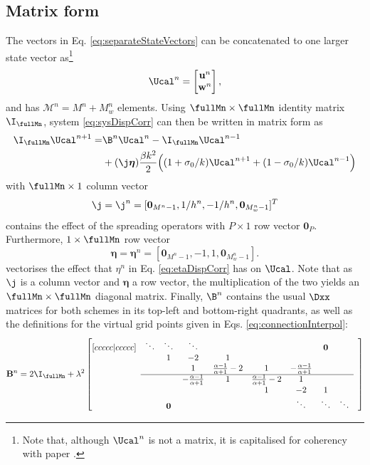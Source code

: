 \subsection{Matrix form}
The vectors in Eq. \eqref{eq:separateStateVectors} can be concatenated to one larger state vector as\footnote{Note that, although $\Ucal^n$ is not a matrix, it is capitalised for coherency with paper \citeP[G].}
\begin{equation}\label{eq:fullState}
    \Ucal^n = \begin{bmatrix}
        \mathbf{u}^n \\
        \mathbf{w}^n
    \end{bmatrix},
\end{equation}
and has $\mathcal{M}^n = M^n+M_w^n$ elements. 
Using $\fullMn \times \fullMn$ identity matrix $\I_\fullMn$, system \eqref{eq:sysDispCorr} can then be written in matrix form as
\begin{equation}\label{eq:intermediateMatrixFormDynamic}
    \begin{aligned}
        \I_\fullMn\Ucal^{n+1} = &\B^n\Ucal^n - \I_\fullMn\Ucal^{n-1} \\
        &+ (\j\boldsymbol{\eta})\frac{\beta k^2}{2}\Big((1+\sigma_0/k)\Ucal^{n+1} + (1-\sigma_0/k)\Ucal^{n-1}\Big)
    \end{aligned}
\end{equation}
with $\fullMn \times 1$ column vector
\begin{equation*}
    \j = \j^n = [\mathbf{0}_{M^n-1}, 1/h^n, -1/h^n, \mathbf{0}_{M_w^n-1}]^T
\end{equation*}
contains the effect of the spreading operators with $P\times 1$ row vector $\mathbf{0}_P$. Furthermore, $1\times \fullMn$ row vector
\begin{equation*}
    \boldsymbol{\eta} = \boldsymbol{\eta}^n = [\mathbf{0}_{M^n-1}, -1, 1, \mathbf{0}_{M_w^n-1}].
\end{equation*}
vectorises the effect that $\eta^n$ in Eq. \eqref{eq:etaDispCorr} has on $\Ucal$. Note that as $\j$ is a column vector and $\boldsymbol{\eta}$ a row vector, the multiplication of the two yields an $\fullMn\times\fullMn$ diagonal matrix. Finally, $\B^n$ contains the usual $\Dxx$ matrices for both schemes in its top-left and bottom-right quadrants, as well as the definitions for the virtual grid points given in Eqs. \eqref{eq:connectionInterpol}:
\begin{equation*}\label{eq:quadMat}
    \mathbf{B}^n = 2\I_\fullMn + \lambda^2\begin{bmatrix}[ccccc|ccccc]
     & \ddots& \ddots  &\ddots & & & & \mathbf{0} & & \\
      & & 1 & -2 & 1 & & & & & \\
     & & & 1 & \frac{\alpha - 1}{\alpha + 1} -2& 1 & -\frac{\alpha - 1}{\alpha + 1} & & \\ \cline{2-9}
     & & & -\frac{\alpha - 1}{\alpha + 1} & 1 & \frac{\alpha - 1}{\alpha + 1} -2 & 1 & & & \\
        & & & & &1 & -2 & 1 & & \\
       & & \mathbf{0} & & &  &\ddots & \ddots &\ddots &
    \end{bmatrix}
\end{equation*}
